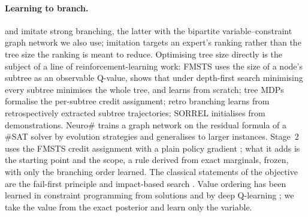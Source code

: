 \documentclass[final,5p,times,twocolumn,authoryear]{elsarticle}
\begin{document}
\paragraph{Learning to branch.} \citet{khalil2016learning} and \citet{gasse2019exact} imitate strong branching, the latter with the bipartite variable--constraint graph network we also use; imitation targets an expert's ranking rather than the tree size the ranking is meant to reduce. Optimising tree size directly is the subject of a line of reinforcement-learning work: FMSTS \citep{etheve2020reinforcement} uses the size of a node's subtree as an observable Q-value, shows that under depth-first search minimising every subtree minimises the whole tree, and learns from scratch; tree MDPs \citep{scavuzzo2022learning} formalise the per-subtree credit assignment; retro branching \citep{parsonson2023reinforcement} learns from retrospectively extracted subtree trajectories; SORREL \citep{sorrel2025} initialises from demonstrations. Neuro\# \citep{vaezipoor2021learning} trains a graph network on the residual formula of a \#SAT solver by evolution strategies and generalises to larger instances. Stage~2 uses the FMSTS credit assignment with a plain policy gradient \citep{williams1992simple}; what it adds is the starting point and the scope, a rule derived from exact marginals, frozen, with only the branching order learned. The classical statements of the objective are the fail-first principle \citep{haralick1980increasing} and impact-based search \citep{refalo2004impact}. Value ordering has been learned in constraint programming from solutions \citep{chu2015learning} and by deep Q-learning \citep{cappart2021combining}; we take the value from the exact posterior and learn only the variable.
\end{document}
